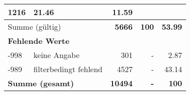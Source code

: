 \begin{longtable}{lXrrr}
       \num{1216} &
       \num[round-mode=places,round-precision=2]{21,46} &
         \num[round-mode=places,round-precision=2]{11,59} \\
     \midrule
     \multicolumn{2}{l}{Summe (gültig)} &
       \textbf{\num{5666}} &
     \textbf{100} &
       \textbf{\num[round-mode=places,round-precision=2]{53,99}} \\
     \multicolumn{5}{l}{\textbf{Fehlende Werte}}\\
       -998 &
       keine Angabe &
         \num{301} &
        - &
         \num[round-mode=places,round-precision=2]{2,87} \\
       -989 &
       filterbedingt fehlend &
         \num{4527} &
        - &
         \num[round-mode=places,round-precision=2]{43,14} \\
     \midrule
     \multicolumn{2}{l}{\textbf{Summe (gesamt)}} &
          \textbf{\num{10494}} &
        \textbf{-} &
        \textbf{100} \\
     \bottomrule
     \end{longtable}
     
